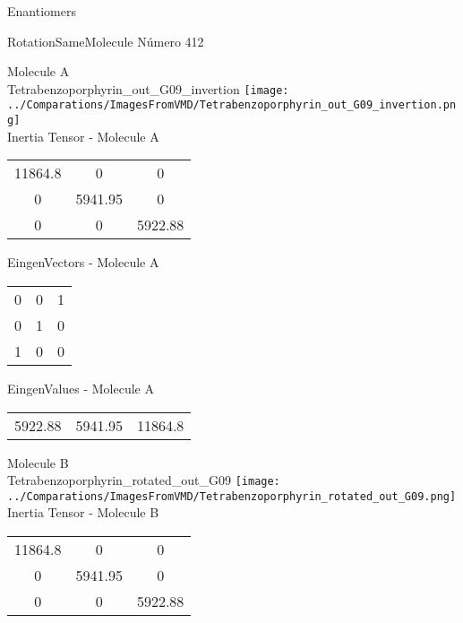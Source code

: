 \begin{center}
\vtab
\vtab
\textcolor{NavyBlue}{\Large Enantiomers}
\end{center}

 \newpage

\vtab[-2cm]
\begin{center}
{\large RotationSameMolecule \tab Número 412}
\end{center}
\begin{multicols}{2}
\begin{center}

Molecule A \\ 
Tetrabenzoporphyrin\_out\_G09\_invertion
\texttt{[image: ../Comparations/ImagesFromVMD/Tetrabenzoporphyrin\_out\_G09\_invertion.png]}
\\
Inertia Tensor - Molecule A \\
\vtab

\begin{tabular}{|c c c|}
11864.8	 & 	0	 & 	0	 \\
0	 & 	5941.95	 & 	0	 \\
0	 & 	0	 & 	5922.88
\end{tabular}

\vtab
 EingenVectors - Molecule A     \\
\vtab
\begin{tabular}{|c c c|}
0	 & 	0	 & 	1	 \\
0	 & 	1	 & 	0	 \\
1	 & 	0	 & 	0
\end{tabular}

\vtab
 EingenValues - Molecule A     \\
\vtab
\begin{tabular}{|c c c|}
5922.88	 & 	5941.95	 & 	11864.8	 \\
\end{tabular}
\columnbreak

Molecule B \\ 
Tetrabenzoporphyrin\_rotated\_out\_G09
\texttt{[image: ../Comparations/ImagesFromVMD/Tetrabenzoporphyrin\_rotated\_out\_G09.png]}
\\
Inertia Tensor - Molecule B \\
\vtab

\begin{tabular}{|c c c|}
11864.8	 & 	0	 & 	0	 \\
0	 & 	5941.95	 & 	0	 \\
0	 & 	0	 & 	5922.88
\end{tabular}


\end{center}
\end{multicols}
